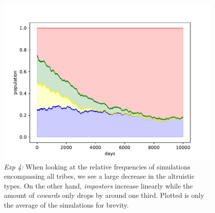 \documentclass[sigconf]{acmart}
\newcommand{\cowards}{\textit{cowards}\xspace}
\newcommand{\impostors}{\textit{impostors}\xspace}
\begin{document}
    \begin{figure}
        \includegraphics[width=\columnwidth]{figures/exp4_impostor_rel}
        \caption{\textit{Exp 4:} When looking at the relative frequencies of simulations encompassing all tribes, we see a large decrease in the altruistic types.
        On the other hand, \impostors increase linearly while the amount of \cowards only drops by around one third.
        Plotted is only the average of the simulations for brevity.}
        \label{fig:exp4_impostor_rel}
    \end{figure}
\end{document}
